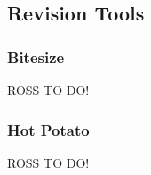 \documentclass{l3proj}
\begin{document}
\subsection{Revision Tools}

\subsubsection{Bitesize}

ROSS TO DO!

\subsubsection{Hot Potato}

ROSS TO DO!
\end{document}

